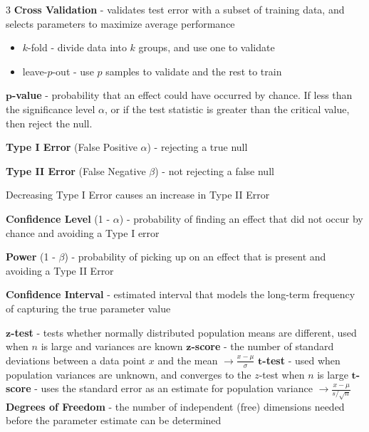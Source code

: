 \documentclass[10pt,landscape,letterpaper]{article}
\makeatletter
\renewcommand{\section}{\@startsection{section}{1}{0mm}%
                                {-1ex plus -.5ex minus -.2ex}%
                                {0.5ex plus .2ex}%
                                {\normalfont\large\bfseries}}
\makeatother
\begin{document}
\begin{multicols}{3}
\textbf{Cross Validation} - validates test error with a subset of training data, and selects parameters to maximize average performance
\begin{itemize}[label={--},leftmargin=4mm]
\itemsep -.4mm
\vspace{-1mm}
\item $k$-fold - divide data into $k$ groups, and use one to validate
\item leave-$p$-out  - use $p$ samples to validate and the rest to train
\end{itemize}

\columnbreak
$\boldsymbol p$\textbf{-value} - probability that an effect could have occurred by chance. If less than the significance level $\alpha$, or if the test statistic is greater than the critical value, then reject the null.

\textbf{Type I Error} (False Positive $\alpha$) - rejecting a true null

\textbf{Type II  Error} (False Negative $\beta$)  - not rejecting a false null

Decreasing Type I Error causes an increase in Type II Error

\textbf{Confidence Level} (1 - $\alpha$) - probability of finding an effect that did not occur by chance and avoiding a Type I error

\textbf{Power} (1 - $\beta$) - probability of picking up on an effect that is present and avoiding a Type II Error

\textbf{Confidence Interval} - estimated interval that models the long-term frequency of capturing the true parameter value

$\boldsymbol{z}$\textbf{-test} - tests whether normally distributed population means are different, used when $n$ is large and variances are known
\vspace{-.5mm}
$\boldsymbol{z}$\textbf{-score} - the number of standard deviations between a data point $x$ and the mean $\to \frac{x - \mu}{\sigma}$
\vspace{-.5mm}
$\boldsymbol{t}$\textbf{-test} - used when population variances are unknown, and converges to the $z$-test when $n$ is large
\vspace{-.5mm}
$\boldsymbol{t}$\textbf{-score} - uses the standard error as an estimate for population variance $\to \frac{x - \mu}{s/\sqrt{n}}$
\vspace{-.5mm}
\textbf{Degrees of Freedom} - the number of independent (free) dimensions needed before the parameter estimate can be determined


\end{multicols}
\end{document}
